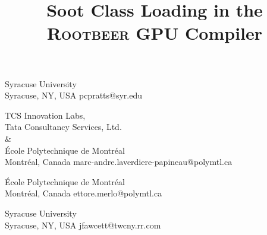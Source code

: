 \documentclass{sigplanconf}
\begin{document}
\newcommand*{\rb}{\textsc{Rootbeer}\xspace}
\newcommand*{\sootclass}{\texttt{SootClass}\xspace}
\newcommand*{\sootmethod}{\texttt{SootMethod}\xspace}
\newcommand*{\sootfield}{\texttt{SootField}\xspace}

\lstset{
  basicstyle=\footnotesize\tt,        %
  breakatwhitespace=false,         %
  breaklines=true,                 %
  captionpos=b,                    %
  extendedchars=true,              %
  frame=single,                    %
  language=Java,                 %
  keywordstyle=\bf,
  showspaces=false,                %
  showstringspaces=false,          %
  showtabs=false,                  %
  tabsize=2                       %
}


\title{Soot Class Loading in the \rb GPU Compiler}

           {Syracuse University\\Syracuse, NY, USA}
           {pcpratts@syr.edu}

           {TCS Innovation Labs,\\Tata Consultancy Services, Ltd.\\\&\\
			École Polytechnique de Montréal\\
			Montréal, Canada}
           {marc-andre.laverdiere-papineau@polymtl.ca}

          
           
           {École Polytechnique de Montréal\\
			Montréal, Canada}
           {ettore.merlo@polymtl.ca}           
           
           {Syracuse University\\Syracuse, NY, USA}
           {jfawcett@twcny.rr.com}        
 
\end{document}
